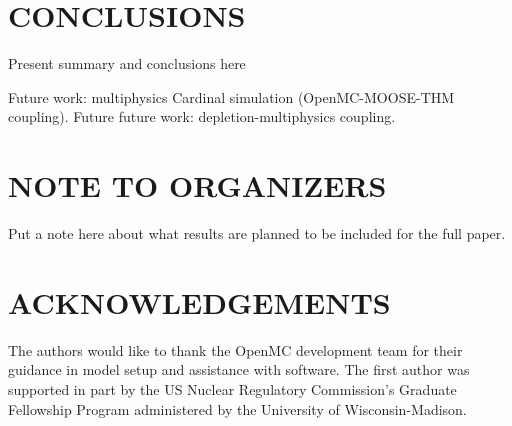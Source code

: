 \documentclass[letterpaper]{physor2024}
\begin{document}
\section{CONCLUSIONS}\label{sec:conclusions}
Present summary and conclusions here

Future work: multiphysics Cardinal simulation (OpenMC-MOOSE-THM coupling). Future future work: depletion-multiphysics coupling.

\section*{NOTE TO ORGANIZERS}
Put a note here about what results are planned to be included for the full paper.

\section*{ACKNOWLEDGEMENTS}
The authors would like to thank the OpenMC development team for their guidance in model setup and assistance with software. The first author was supported in part by the US Nuclear Regulatory Commission's Graduate Fellowship Program administered by the University of Wisconsin-Madison.

\printglossaries



\end{document}
